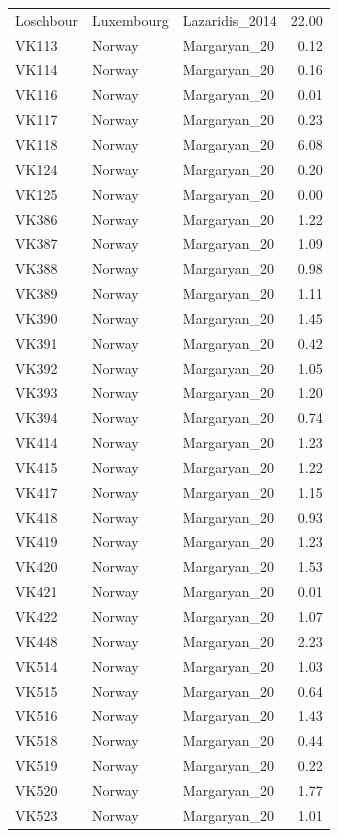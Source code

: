 \begin{longtable}[t]{lllr}
Loschbour & Luxembourg & Lazaridis\_2014 & 22.00\\
VK113 & Norway & Margaryan\_20 & 0.12\\
VK114 & Norway & Margaryan\_20 & 0.16\\
VK116 & Norway & Margaryan\_20 & 0.01\\
VK117 & Norway & Margaryan\_20 & 0.23\\
VK118 & Norway & Margaryan\_20 & 6.08\\
VK124 & Norway & Margaryan\_20 & 0.20\\
VK125 & Norway & Margaryan\_20 & 0.00\\
VK386 & Norway & Margaryan\_20 & 1.22\\
VK387 & Norway & Margaryan\_20 & 1.09\\
VK388 & Norway & Margaryan\_20 & 0.98\\
VK389 & Norway & Margaryan\_20 & 1.11\\
VK390 & Norway & Margaryan\_20 & 1.45\\
VK391 & Norway & Margaryan\_20 & 0.42\\
VK392 & Norway & Margaryan\_20 & 1.05\\
VK393 & Norway & Margaryan\_20 & 1.20\\
VK394 & Norway & Margaryan\_20 & 0.74\\
VK414 & Norway & Margaryan\_20 & 1.23\\
VK415 & Norway & Margaryan\_20 & 1.22\\
VK417 & Norway & Margaryan\_20 & 1.15\\
VK418 & Norway & Margaryan\_20 & 0.93\\
VK419 & Norway & Margaryan\_20 & 1.23\\
VK420 & Norway & Margaryan\_20 & 1.53\\
VK421 & Norway & Margaryan\_20 & 0.01\\
VK422 & Norway & Margaryan\_20 & 1.07\\
VK448 & Norway & Margaryan\_20 & 2.23\\
VK514 & Norway & Margaryan\_20 & 1.03\\
VK515 & Norway & Margaryan\_20 & 0.64\\
VK516 & Norway & Margaryan\_20 & 1.43\\
VK518 & Norway & Margaryan\_20 & 0.44\\
VK519 & Norway & Margaryan\_20 & 0.22\\
VK520 & Norway & Margaryan\_20 & 1.77\\
VK523 & Norway & Margaryan\_20 & 1.01\\

\end{longtable}
